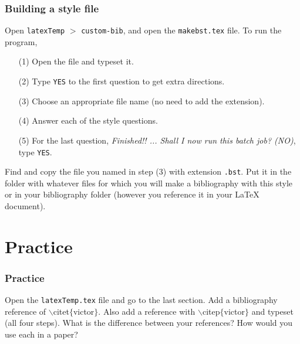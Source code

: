 \begin{frame}  \frametitle{Building a style file}
	Open \texttt{latexTemp} $>$ \texttt{custom-bib}, and open the \texttt{\color{highlight}makebst.tex} file. To run the program,
	\begin{itemize}
		\item[(1)] Open the file and typeset it.
		\item[(2)] Type \texttt{YES} to the first question to get extra directions.
		\item[(3)] Choose an appropriate file name (no need to add the extension).
		\item[(4)] Answer each of the style questions.
		\item[(5)] For the last question, \textit{Finished!! ...  Shall I now run this batch job? (NO)}, type \texttt{YES}.
	\end{itemize}
	Find and copy the file you named in step (3) with extension \texttt{.bst}. Put it in the folder with whatever files for which you will make a bibliography with this style or in your bibliography folder (however you reference it in your LaTeX document).
\end{frame}

\section{Practice}

\begin{frame}  \frametitle{Practice}
	Open the \texttt{\color{highlight}latexTemp.tex} file and go to the last section. Add a bibliography reference of {\color{command}$\backslash$citet}{\color{braces}$\{${\color{black}victor}$\}$}. Also add a reference with {\color{command}$\backslash$citep}{\color{braces}$\{${\color{black}victor}$\}$} and typeset (all four steps). What is the difference between your references? How would you use each in a paper?\end{frame}



